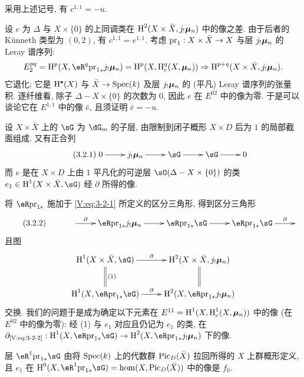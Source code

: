 \begin{proposition_}\label{V:3-2}
采用上述记号, 有 $c^{1,1}=-u$.
\end{proposition_}

设 $e$ 为 $\Delta$ 与 $X\times\{0\}$ 的上同调类在
$\operatorname{H}^2(X\times \bar X,j_!{\bm\mu}_n)$ 中的像之差.
由于后者的 K\"unneth 类型为 $(0,2)$, 有 $c^{1,1}=e^{1,1}$.
考虑 $\mathrm{pr}_1:X\times \bar X\to X$ 与层 $j_!{\bm\mu}_n$ 的 Leray 谱序列:
\[
  E_2^{pq} = \h^p(X,\eR^q {\pr_1}_\ast j_!\dmu_n) = \h^p(X,\h_c^q(X,\dmu_n)) \Rightarrow \h^{p+q}(X\times \bar X,j_!\dmu_n) \text{.}
\]
它退化: 它是 $\h^\bullet(X)$ 与 $\bar X\to \operatorname{Spec}(k)$ 及层 $j_!{\bm\mu}_n$ 的 (平凡) Leray 谱序列的张量积.
逐纤维看, 除子 $\Delta-X\times\{0\}$ 的次数为 $0$,
因此 $e$ 在 $E^{02}$ 中的像为零.
于是可以谈论它在 $E^{1,1}$ 中的像 $\bar e$, 且须证明 $\bar e = -u$.

设 $X\times\bar X$ 上的 $\sG$ 为 $\dG_m$ 的子层,
由限制到闭子概形 $X\times D$ 后为 $1$ 的局部截面组成. 又有正合列
\begin{equation*}\tag{3.2.1}\label{V:eq:3-2-1}
\xymatrix{
  0 \ar[r]
    & j_!\dmu_n \ar[r]
    & \sG \ar[r]
    & \sG \ar[r]
    & 0
}
\end{equation*}
而 $e$ 是在 $X\times D$ 上由 $1$ 平凡化的可逆层 $\sO(\Delta-X\times\{0\})$
的类 $e_1\in \h^1(X\times\bar X,\sG)$ 经 $\partial$ 所得的像.

将 $\eR\pr_{1\ast}$ 施加于 \eqref{V:eq:3-2-1} 所定义的区分三角形, 得到区分三角形
\begin{equation*}\tag{3.2.2}\label{V:eq:3-2-2}
\xymatrix{
  & \ar[r]^-\partial
    & \eR \pr_{1\ast} j_!\dmu_n \ar[r]
    & \eR \pr_{1\ast}\sG \ar[r]
    & \eR \pr_{1\ast}\sG \ar[r]^-\partial
    &
}
\end{equation*}
且图
\[\xymatrix{
  \h^1(X\times \bar X,\sG) \ar[r]^-\partial \ar@{=}[d]^-{(1)}
    & \h^2(X\times \bar X,j_!\dmu_n) \ar@{=}[d] \\
  \h^1(X,\eR\pr_{1\ast} \sG) \ar[r]^-\partial
    & \h^2(X,\eR\pr_{1\ast} j_!\dmu_n)
}\]
交换. 我们的问题于是成为确定以下元素在
$E^{11}=\operatorname{H}^1(X,\operatorname{H}_c^1(X,{\bm\mu}_n))$ 中的像 (在 $E^{02}$ 中的像为零):
经 (1) 与 $e_1$ 对应且仍记为 $e_1$ 的类, 在
$\partial_{\text{\eqref{V:eq:3-2-2}}}:\h^1(X,\eR\pr_{1\ast}\sG) \to \h^2(X,\eR\pr_{1\ast} j_!\dmu_n)$ 下的像.

层 $\eR^1\pr_{1\ast}\sG$ 由将 $\operatorname{Spec}(k)$ 上的代数群 $\operatorname{Pic}_D(\bar X)$
拉回所得的 $X$ 上群概形定义, 且 $e_1$ 在
$\h^0(X,\eR^1\pr_{1\ast}\sG) = \hom(X,\pic_D(\bar X))$ 中的像是 $f_0$.

